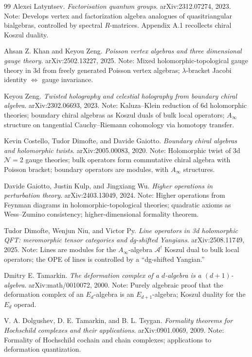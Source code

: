 \begin{thebibliography}{99}
Alexei Latyntsev.
\textit{Factorisation quantum groups}.
arXiv:2312.07274, 2023.
Note: Develops vertex and factorization algebra analogues of
quasitriangular bialgebras, controlled by spectral $R$-matrices.
Appendix A.1 recollects chiral Koszul duality.

Ahsan Z. Khan and Keyou Zeng.
\textit{Poisson vertex algebras and three dimensional gauge theory}.
arXiv:2502.13227, 2025.
Note: Mixed holomorphic-topological gauge theory in 3d from
freely generated Poisson vertex algebras;
$\lambda$-bracket Jacobi identity $\Leftrightarrow$ gauge invariance.

Keyou Zeng.
\textit{Twisted holography and celestial holography from boundary chiral algebra}.
arXiv:2302.06693, 2023.
Note: Kaluza--Klein reduction of 6d holomorphic theories; boundary chiral
algebras as Koszul duals of bulk local operators; $A_\infty$ structure on
tangential Cauchy--Riemann cohomology via homotopy transfer.

Kevin Costello, Tudor Dimofte, and Davide Gaiotto.
\textit{Boundary chiral algebras and holomorphic twists}.
arXiv:2005.00083, 2020.
Note: Holomorphic twist of 3d $\mathcal{N}=2$ gauge theories;
bulk operators form commutative chiral algebra with Poisson bracket;
boundary operators are modules, with $A_\infty$ structures.

Davide Gaiotto, Justin Kulp, and Jingxiang Wu.
\textit{Higher operations in perturbation theory}.
arXiv:2403.13049, 2024.
Note: Higher operations from Feynman diagrams in holomorphic-topological
theories; quadratic axioms as Wess--Zumino consistency;
higher-dimensional formality theorem.

Tudor Dimofte, Wenjun Niu, and Victor Py.
\textit{Line operators in 3d holomorphic QFT: meromorphic tensor categories
and dg-shifted Yangians}.
arXiv:2508.11749, 2025.
Note: Lines are modules for the $A_\infty$-algebra $\mathcal{A}^!$
Koszul dual to bulk local operators; the OPE of lines is controlled
by a ``dg-shifted Yangian.''

Dmitry E. Tamarkin.
\textit{The deformation complex of a $d$-algebra is a $(d+1)$-algebra}.
arXiv:math/0010072, 2000.
Note: Purely algebraic proof that the deformation complex of an $E_d$-algebra
is an $E_{d+1}$-algebra; Koszul duality for the $E_d$ operad.

V. A. Dolgushev, D. E. Tamarkin, and B. L. Tsygan.
\textit{Formality theorems for Hochschild complexes and their applications}.
arXiv:0901.0069, 2009.
Note: Formality of Hochschild cochain and chain complexes; applications
to deformation quantization.


\end{thebibliography}
